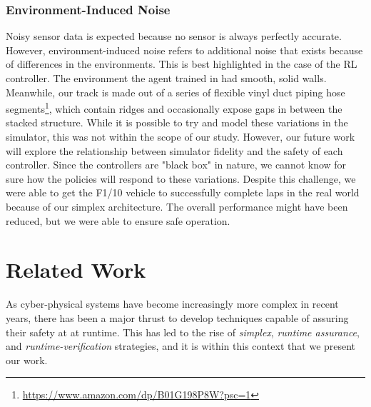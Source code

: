\documentclass[manuscript,screen,review]{acmart}
\begin{document}
\subsubsection{Environment-Induced Noise} Noisy sensor data is expected because no sensor is always perfectly accurate. However, environment-induced noise refers to additional noise that exists because of differences in the environments. This is best highlighted in the case of the RL controller. The environment the agent trained in had smooth, solid walls. Meanwhile, our track is made out of a series of flexible vinyl duct piping hose segments\footnote{\url{https://www.amazon.com/dp/B01G198P8W?psc=1}}, which contain ridges and occasionally expose gaps in between the stacked structure.
While it is possible to try and model these variations in the simulator, this was not within the scope of our study. However, our future work will explore the relationship between simulator fidelity and the safety of each controller. Since the controllers are "black box" in nature, we cannot know for sure how the policies will respond to these variations. Despite this challenge, we were able to get the F1/10 vehicle to successfully complete laps in the real world because of our simplex architecture. The overall performance might have been reduced, but we were able to ensure safe operation.

\section{Related Work}

As cyber-physical systems have become increasingly more complex in recent years, there has been a major thrust to develop techniques capable of assuring their safety at at runtime. %
 This has led to the rise of \textit{simplex}, \textit{runtime assurance}, and \textit{runtime-verification} strategies, and it is within this context that we present our work.
\end{document}
